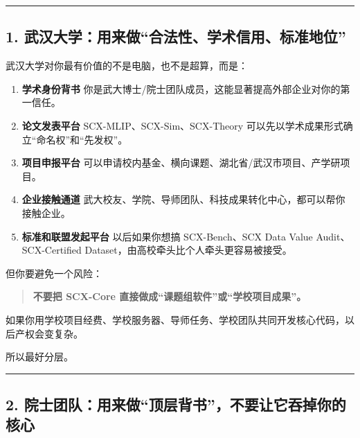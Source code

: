 \documentclass[
  12pt,
]{ctexart}
\begin{document}
\begin{center}\rule{0.5\linewidth}{0.5pt}\end{center}

\subsection{1.
武汉大学：用来做``合法性、学术信用、标准地位''}\label{ux6b66ux6c49ux5927ux5b66ux7528ux6765ux505aux5408ux6cd5ux6027ux5b66ux672fux4fe1ux7528ux6807ux51c6ux5730ux4f4d}

武汉大学对你最有价值的不是电脑，也不是超算，而是：

\begin{enumerate}
\def\labelenumi{\arabic{enumi}.}
\item
  \textbf{学术身份背书}
  你是武大博士/院士团队成员，这能显著提高外部企业对你的第一信任。
\item
  \textbf{论文发表平台} SCX-MLIP、SCX-Sim、SCX-Theory
  可以先以学术成果形式确立``命名权''和``先发权''。
\item
  \textbf{项目申报平台}
  可以申请校内基金、横向课题、湖北省/武汉市项目、产学研项目。
\item
  \textbf{企业接触通道}
  武大校友、学院、导师团队、科技成果转化中心，都可以帮你接触企业。
\item
  \textbf{标准和联盟发起平台} 以后如果你想搞 SCX-Bench、SCX Data Value
  Audit、SCX-Certified Dataset，由高校牵头比个人牵头更容易被接受。
\end{enumerate}

但你要避免一个风险：

\begin{quote}
\textbf{不要把 SCX-Core 直接做成``课题组软件''或``学校项目成果''。}
\end{quote}

如果你用学校项目经费、学校服务器、导师任务、学校团队共同开发核心代码，以后产权会变复杂。

所以最好分层。

\begin{center}\rule{0.5\linewidth}{0.5pt}\end{center}

\subsection{2.
院士团队：用来做``顶层背书''，不要让它吞掉你的核心}\label{ux9662ux58ebux56e2ux961fux7528ux6765ux505aux9876ux5c42ux80ccux4e66ux4e0dux8981ux8ba9ux5b83ux541eux6389ux4f60ux7684ux6838ux5fc3}
\end{document}
